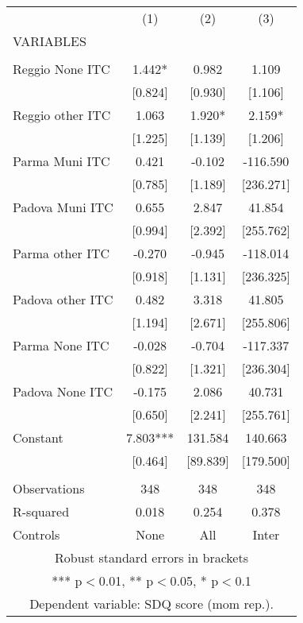 \begin{tabular}{lccc} \hline
 & (1) & (2) & (3) \\
VARIABLES &  &  &  \\ \hline
 &  &  &  \\
Reggio None ITC & 1.442* & 0.982 & 1.109 \\
 & [0.824] & [0.930] & [1.106] \\
Reggio other ITC & 1.063 & 1.920* & 2.159* \\
 & [1.225] & [1.139] & [1.206] \\
Parma Muni ITC & 0.421 & -0.102 & -116.590 \\
 & [0.785] & [1.189] & [236.271] \\
Padova Muni ITC & 0.655 & 2.847 & 41.854 \\
 & [0.994] & [2.392] & [255.762] \\
Parma other ITC & -0.270 & -0.945 & -118.014 \\
 & [0.918] & [1.131] & [236.325] \\
Padova other ITC & 0.482 & 3.318 & 41.805 \\
 & [1.194] & [2.671] & [255.806] \\
Parma None ITC & -0.028 & -0.704 & -117.337 \\
 & [0.822] & [1.321] & [236.304] \\
Padova None ITC & -0.175 & 2.086 & 40.731 \\
 & [0.650] & [2.241] & [255.761] \\
Constant & 7.803*** & 131.584 & 140.663 \\
 & [0.464] & [89.839] & [179.500] \\
 &  &  &  \\
Observations & 348 & 348 & 348 \\
R-squared & 0.018 & 0.254 & 0.378 \\
 Controls & None & All & Inter \\ \hline
\multicolumn{4}{c}{ Robust standard errors in brackets} \\
\multicolumn{4}{c}{ *** p$<$0.01, ** p$<$0.05, * p$<$0.1} \\
\multicolumn{4}{c}{ Dependent variable: SDQ score (mom rep.).} \\
\end{tabular}
